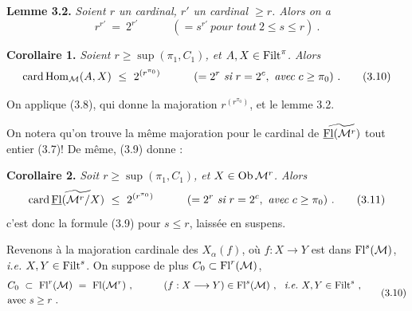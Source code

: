 \textbf{Lemme 3.2.} \textit{Soient $r$ un cardinal, $r'$ un cardinal $\geq r$. Alors on a}
\[
r^{r'}\ =\ 2^{r'}\qquad\quad(=s^{r'}\ \textit{pour tout}\ 2\leq s\leq r)\ .
\]

\textbf{Corollaire 1.} \textit{Soient $r\geq\sup(\pi_1,C_1)$, et $A,X\in\mathrm{Filt}^\pi$. Alors}
\[
\card\Hom_{\M}(A,X)\ \leq\ 2^{(r^{\pi_0})}\qquad\quad(=2^r\ \textit{si}\ r=2^c,\ \textit{avec}\ c\geq\pi_0)\ . \tag*{(3.10)}
\]

On applique (3.8), qui donne la majoration $r^{(r^{\pi_0})}$, et le lemme 3.2.

On notera qu'on trouve la même majoration pour le cardinal de $\widetilde{\underline{\mathrm{Fl}}(\mathcal{M}^r)}$ tout entier (3.7)! De même, (3.9) donne :

\textbf{Corollaire 2.} \textit{Soit $r\geq\sup(\pi_1,C_1)$, et $X\in\operatorname{Ob}\mathcal{M}^r$. Alors}
\[
\card\wavy{\uFl(\M^r/X)}\ \leq\ 2^{(r^{\pi_0})}\qquad\quad(=2^r\ \textit{si}\ r=2^c,\ \textit{avec}\ c\geq\pi_0)\ . \tag*{(3.11)}
\]
c'est donc la formule (3.9) pour $s\leq r$, laissée en suspens.

Revenons à la majoration cardinale des $X_\alpha(f)$, où $f : X\longrightarrow Y$ est dans $\mathrm{Fl}^s(\mathcal{M})$, \textit{i.e.} $X,Y\in\mathrm{Filt}^s$. On suppose de plus $C_0\subset\mathrm{Fl}^r(\mathcal{M})$,
\[
\begin{aligned}
&C_0\ \subset\ \Fl^r(\M)\ =\ \Fl(\M^r)\ ,\qquad\quad(f:X\longrightarrow Y)\in\Fl^s(\M)\ ,\ \ \textit{i.e.}\ X,Y\in\Filt^s\ ,\\
&\text{avec } s\geq r\ .
\end{aligned} \tag*{(3.10)}
\]

